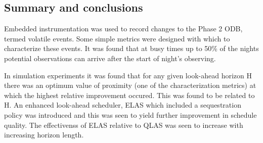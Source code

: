 \subsection{Summary and conclusions}
Embedded instrumentation was used to record changes to the Phase 2 ODB, termed volatile events. Some simple metrics were designed with which to characterize these events. It was found that at busy times up to 50\% of the nights potential observations can arrive after the start of night's observing.

In simulation experiments it was found that for any given look-ahead horizon H there was an optimum value of proximity (one of the characterization metrics) at which the highest relative improvement occured. This was found to be related to H. An enhanced look-ahead scheduler, ELAS which included a sequestration policy was introduced and this was seen to yield further improvement in schedule quality. The effectivenss of ELAS relative to QLAS was seen to increase with increasing horizon length.
